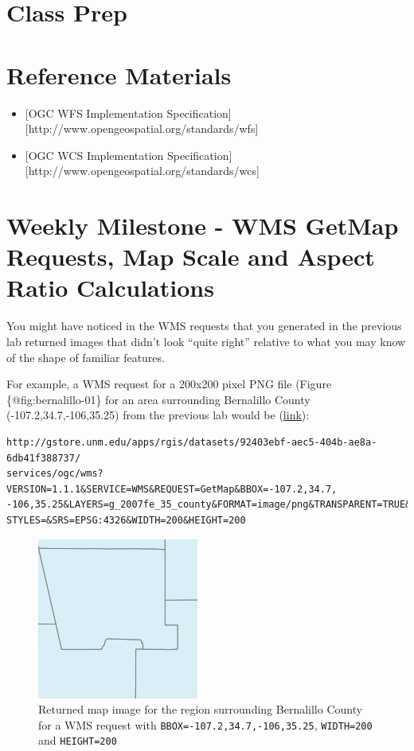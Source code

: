 \documentclass[]{book}
\begin{document}
\section{Class Prep}\label{week07-prep}

\section{Reference Materials}\label{week07-reference}

\begin{itemize}
\item
  {[}OGC WFS Implementation
  Specification{]}{[}http://www.opengeospatial.org/standards/wfs{]}
\item
  {[}OGC WCS Implementation
  Specification{]}{[}http://www.opengeospatial.org/standards/wcs{]}
\end{itemize}

\section{Weekly Milestone - WMS GetMap Requests, Map Scale and Aspect
Ratio Calculations}\label{week07-milestone}

You might have noticed in the WMS requests that you generated in the
previous lab returned images that didn't look ``quite right'' relative
to what you may know of the shape of familiar features.

For example, a WMS request for a 200x200 pixel PNG file (Figure
\{@fig:bernalillo-01\} for an area surrounding Bernalillo County
(-107.2,34.7,-106,35.25) from the previous lab would be
(\href{http://gstore.unm.edu/apps/rgis/datasets/92403ebf-aec5-404b-ae8a-6db41f388737/services/ogc/wms?VERSION=1.1.1\&SERVICE=WMS\&REQUEST=GetMap\&BBOX=-107.2,34.7,-106,35.25\&LAYERS=g_2007fe_35_county\&FORMAT=image/png\&TRANSPARENT=TRUE\&STYLES=\&SRS=EPSG:4326\&WIDTH=200\&HEIGHT=200}{link}):

\begin{verbatim}
http://gstore.unm.edu/apps/rgis/datasets/92403ebf-aec5-404b-ae8a-6db41f388737/
services/ogc/wms?VERSION=1.1.1&SERVICE=WMS&REQUEST=GetMap&BBOX=-107.2,34.7,
-106,35.25&LAYERS=g_2007fe_35_county&FORMAT=image/png&TRANSPARENT=TRUE&
STYLES=&SRS=EPSG:4326&WIDTH=200&HEIGHT=200
\end{verbatim}

\begin{figure}[htbp]
\centering
\includegraphics{images/bernalillo_01.png}
\caption{Returned map image for the region surrounding Bernalillo County
for a WMS request with \texttt{BBOX=-107.2,34.7,-106,35.25},
\texttt{WIDTH=200} and \texttt{HEIGHT=200}}
\end{figure}
\end{document}
